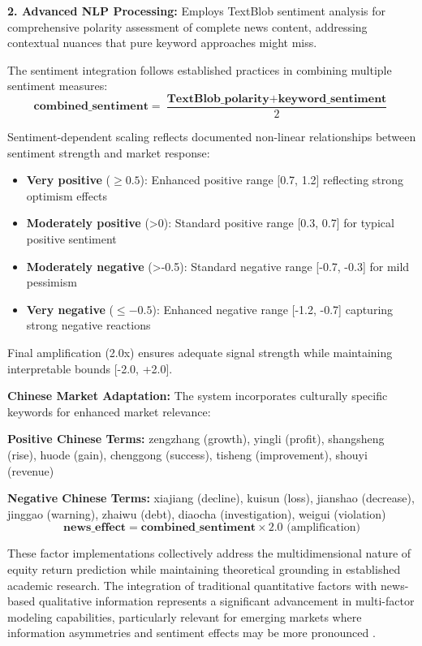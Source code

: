 \documentclass[3p,times,procedia]{elsarticle}
\begin{document}
\textbf{2. Advanced NLP Processing:} Employs TextBlob \cite{Loria2019} sentiment analysis for comprehensive polarity assessment of complete news content, addressing contextual nuances that pure keyword approaches might miss.

The sentiment integration follows established practices in combining multiple sentiment measures:
\begin{equation}
    \textbf{combined\_sentiment} = \frac{\textbf{TextBlob\_polarity} + \textbf{keyword\_sentiment}}{2}
\end{equation}
\vspace{0.2cm}

Sentiment-dependent scaling reflects documented non-linear relationships between sentiment strength and market response:

\begin{itemize}
    \item \textbf{Very positive} ($\geq 0.5$): Enhanced positive range [0.7, 1.2] reflecting strong optimism effects
    \item \textbf{Moderately positive} (>0): Standard positive range [0.3, 0.7] for typical positive sentiment
    \item \textbf{Moderately negative} (>-0.5): Standard negative range [-0.7, -0.3] for mild pessimism
    \item \textbf{Very negative} ($\leq -0.5$): Enhanced negative range [-1.2, -0.7] capturing strong negative reactions
\end{itemize}

Final amplification (2.0x) ensures adequate signal strength while maintaining interpretable bounds [-2.0, +2.0].

\textbf{Chinese Market Adaptation:} The system incorporates culturally specific keywords for enhanced market relevance:

\textbf{Positive Chinese Terms:} zengzhang (growth), yingli (profit), shangsheng (rise), huode (gain), chenggong (success), tisheng (improvement), shouyi (revenue)

\textbf{Negative Chinese Terms:} xiajiang (decline), kuisun (loss), jianshao (decrease), jinggao (warning), zhaiwu (debt), diaocha (investigation), weigui (violation)
\vspace{-0.1cm}
\begin{equation}
\textbf{news\_effect} = \textbf{combined\_sentiment} \times 2.0 \text{ (amplification)}
\end{equation}

These factor implementations collectively address the multidimensional nature of equity return prediction while maintaining theoretical grounding in established academic research. The integration of traditional quantitative factors with news-based qualitative information represents a significant advancement in multi-factor modeling capabilities, particularly relevant for emerging markets where information asymmetries and sentiment effects may be more pronounced \cite{Harvey2016}.
\end{document}
